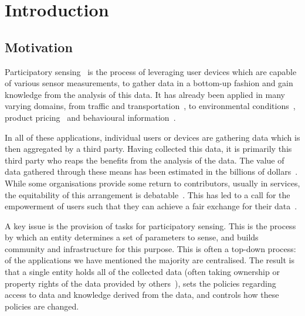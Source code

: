 \chapter{Introduction}\label{ch:introduction}

\section{Motivation}





Participatory sensing~\citep{Burke2006} is the process of leveraging user devices which are capable of various sensor measurements, to gather data in a bottom-up fashion and gain knowledge from the analysis of this data. 
It has already been applied in many varying domains, from traffic and transportation~\citep{Costa2012,Mathur2010}, to environmental conditions~\citep{Hasenfratz2012,Mendez2011}, product pricing~\citep{Deng2009} and behavioural information~\citep{Miluzzo2008}.

In all of these applications, individual users or devices are gathering data which is then aggregated by a third party. Having collected this data, it is primarily this third party who reaps the benefits from the analysis of the data. The value of data gathered through these means has been estimated in the billions of dollars~\citep{Manyika2011}. While some organisations provide some return to contributors, usually in services, the equitability of this arrangement is debatable~\citep{VanDijck2009}. This has led to a call for the empowerment of users such that they can achieve a fair exchange for their data~\citep{BuckinghamShum2012}.

A key issue is the provision of tasks for participatory sensing. This is the process by which an entity determines a set of parameters to sense, and builds community and infrastructure for this purpose.
This is often a top-down process: of the applications we have mentioned the majority are centralised. The result is that a single entity holds all of the collected data (often taking ownership or property rights of the data provided by others~\citep{ohara2010}), sets the policies regarding access to data and knowledge derived from the data, and controls how these policies are changed.

